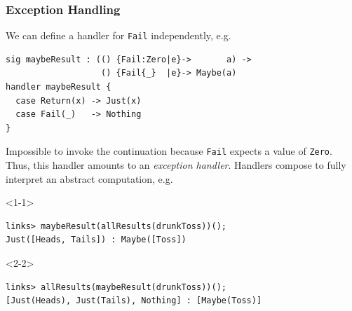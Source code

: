 \documentclass[10pt,compress]{beamer}
\begin{document}
\begin{frame}[fragile]
\frametitle{Exception Handling}
%
We can define a handler for \lstinline$Fail$ independently, e.g.
%
\begin{lstlisting}
sig maybeResult : (() {Fail:Zero|e}->       a) ->
                   () {Fail{_}  |e}-> Maybe(a)
handler maybeResult {
  case Return(x) -> Just(x)
  case Fail(_)   -> Nothing
}
\end{lstlisting}
%
Impossible to invoke the continuation because \lstinline$Fail$ expects
a value of \lstinline$Zero$. Thus, this handler amounts to an \emph{exception handler}.
\vfill
Handlers compose to fully interpret an abstract computation, e.g.
\begin{onlyenv}<1-1>
\begin{lstlisting}[style=terminal]
links> maybeResult(allResults(drunkToss))();
Just([Heads, Tails]) : Maybe([Toss])
\end{lstlisting}
\end{onlyenv}
%
\begin{onlyenv}<2-2>
\begin{lstlisting}[style=terminal]
links> allResults(maybeResult(drunkToss))();
[Just(Heads), Just(Tails), Nothing] : [Maybe(Toss)]
\end{lstlisting}
\end{onlyenv}
\end{frame}
\end{document}
